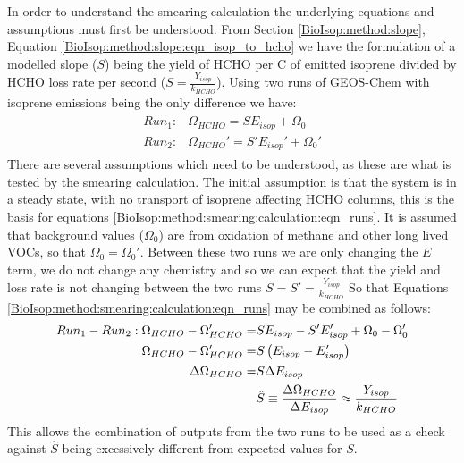       In order to understand the smearing calculation the underlying equations and assumptions must first be understood.
      From Section \ref{BioIsop:method:slope}, Equation \ref{BioIsop:method:slope:eqn_isop_to_hcho} we have the formulation of a modelled slope ($S$) being the yield of HCHO per C of emitted isoprene divided by HCHO loss rate per second ($S = \frac{Y_{isop}}{k_{HCHO}}$).
      Using two runs of GEOS-Chem with isoprene emissions being the only difference we have:
      \begin{eqnarray}
        \label{BioIsop:method:smearing:calculation:eqn_runs}
        \begin{split}
        Run_1 :&  \Omega_{HCHO} = S E_{isop} + \Omega_0 \\
        Run_2 :&  \Omega_{HCHO}' = S' E_{isop}' + \Omega_0' 
        \end{split}
      \end{eqnarray}
      There are several assumptions which need to be understood, as these are what is tested by the smearing calculation.
      The initial assumption is that the system is in a steady state, with no transport of isoprene affecting HCHO columns, this is the basis for equations \ref{BioIsop:method:smearing:calculation:eqn_runs}.
      It is assumed that background values ($\Omega_0$) are from oxidation of methane and other long lived VOCs, so that $\Omega_0 = \Omega_0'$.
      Between these two runs we are only changing the $E$ term, we do not change any chemistry and so we can expect that the yield and loss rate is not changing between the two runs $S = S' = \frac{Y_{isop}}{k_{HCHO}}$
      So that Equations \ref{BioIsop:method:smearing:calculation:eqn_runs} may be combined as follows:
      \begin{eqnarray}
        Run_1-Run_2 : \Omega_{HCHO} - \Omega_{HCHO}' = & S E_{isop} - S' E_{isop}' +\Omega_0 - \Omega_0' \notag \\
        \Omega_{HCHO} - \Omega_{HCHO}' = & S \left( E_{isop} - E_{isop}' \right) \notag \\
        \Delta \Omega_{HCHO} = & S \Delta E_{isop}  \notag \\
        & \hat{S} \equiv \frac{\Delta{\Omega_{HCHO}}}{\Delta E_{isop}} \approx \frac{Y_{isop}}{k_{HCHO}} \label{BioIsop:method:smearing:calculation:eqn_hats}
      \end{eqnarray}
      This allows the combination of outputs from the two runs to be used as a check against $\hat{S}$ being excessively different from expected values for $S$.
      

